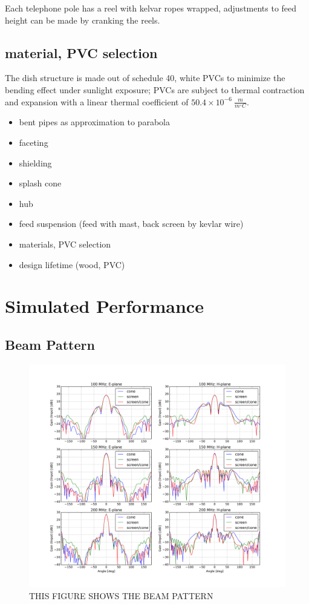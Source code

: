 \documentclass[preprint]{aastex}  %
\begin{document}
Each telephone pole has a reel with kelvar ropes wrapped, adjustments to feed height can be made by cranking the reels.


\subsection{material, PVC selection}
The dish structure is made out of schedule 40, white PVCs to minimize the bending effect under sunlight exposure; PVCs are subject to thermal contraction and expansion with a linear thermal coefficient of $50.4\times10^{-6}\ \frac{m}{m^{\circ}C}$.


\begin{itemize}
\item bent pipes as approximation to parabola 
\item faceting
\item shielding
\item splash cone
\item hub 
\item feed suspension (feed with mast, back screen by kevlar wire)
\item materials, PVC selection 
\item design lifetime (wood, PVC)
\end{itemize}

\section{Simulated Performance}
\label{sec:sim}

\subsection{Beam Pattern}

\begin{figure}[H]
	\begin{center}
	\includegraphics[width =\textwidth]{./dish_plots/Beampatterns_cone}
	\caption{THIS FIGURE SHOWS THE BEAM PATTERN 
\label{Fig:} }
	\end{center}
\end{figure}
\clearpage
\end{document}
